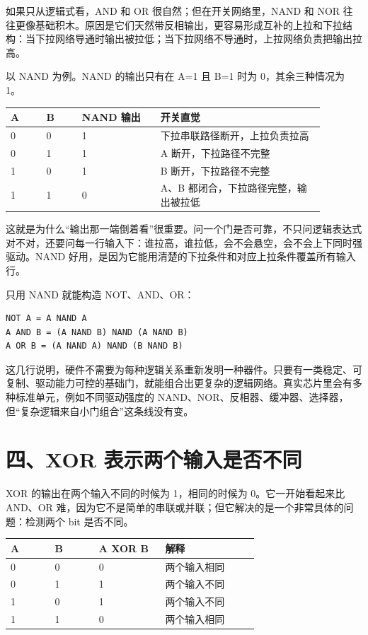 如果只从逻辑式看，AND 和 OR 很自然；但在开关网络里，NAND 和 NOR 往往更像基础积木。原因是它们天然带反相输出，更容易形成互补的上拉和下拉结构：当下拉网络导通时输出被拉低；当下拉网络不导通时，上拉网络负责把输出拉高。

以 NAND 为例。NAND 的输出只有在 A=1 且 B=1 时为 0，其余三种情况为 1。

\begin{longtable}{p{0.1\linewidth}p{0.1\linewidth}p{0.22\linewidth}p{0.46\linewidth}}
\toprule
A & B & NAND 输出 & 开关直觉 \\
\midrule
0 & 0 & 1 & 下拉串联路径断开，上拉负责拉高 \\
0 & 1 & 1 & A 断开，下拉路径不完整 \\
1 & 0 & 1 & B 断开，下拉路径不完整 \\
1 & 1 & 0 & A、B 都闭合，下拉路径完整，输出被拉低 \\
\bottomrule
\end{longtable}

这就是为什么“输出那一端倒着看”很重要。问一个门是否可靠，不只问逻辑表达式对不对，还要问每一行输入下：谁拉高，谁拉低，会不会悬空，会不会上下同时强驱动。NAND 好用，是因为它能用清楚的下拉条件和对应上拉条件覆盖所有输入行。

只用 NAND 就能构造 NOT、AND、OR：

\begin{lstlisting}
NOT A = A NAND A
A AND B = (A NAND B) NAND (A NAND B)
A OR B = (A NAND A) NAND (B NAND B)
\end{lstlisting}

这几行说明，硬件不需要为每种逻辑关系重新发明一种器件。只要有一类稳定、可复制、驱动能力可控的基础门，就能组合出更复杂的逻辑网络。真实芯片里会有多种标准单元，例如不同驱动强度的 NAND、NOR、反相器、缓冲器、选择器，但“复杂逻辑来自小门组合”这条线没有变。

\section{四、XOR 表示两个输入是否不同}

XOR 的输出在两个输入不同的时候为 1，相同的时候为 0。它一开始看起来比 AND、OR 难，因为它不是简单的串联或并联；但它解决的是一个非常具体的问题：检测两个 bit 是否不同。

\begin{longtable}{p{0.16\linewidth}p{0.16\linewidth}p{0.24\linewidth}p{0.34\linewidth}}
\toprule
A & B & A XOR B & 解释 \\
\midrule
0 & 0 & 0 & 两个输入相同 \\
0 & 1 & 1 & 两个输入不同 \\
1 & 0 & 1 & 两个输入不同 \\
1 & 1 & 0 & 两个输入相同 \\
\bottomrule
\end{longtable}

